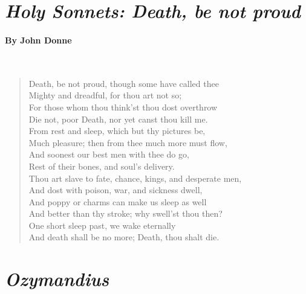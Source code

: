 \documentclass[12pt, openany, letterpaper]{memoir}
\begin{document}
\newpage
{}
\section*{\emph{Holy Sonnets: Death, be not proud}}
\paragraph{By John Donne}~
\begin{verse}
	Death, be not proud, though some have called thee\\
	Mighty and dreadful, for thou art not so;\\
	For those whom thou think'st thou dost overthrow\\
	Die not, poor Death, nor yet canst thou kill me.\\
	From rest and sleep, which but thy pictures be,\\
	Much pleasure; then from thee much more must flow,\\
	And soonest our best men with thee do go,\\
	Rest of their bones, and soul's delivery.\\
	Thou art slave to fate, chance, kings, and desperate men,\\
	And dost with poison, war, and sickness dwell,\\
	And poppy or charms can make us sleep as well\\
	And better than thy stroke; why swell'st thou then?\\
	One short sleep past, we wake eternally\\
	And death shall be no more; Death, thou shalt die.
\end{verse}

\newpage
\section*{\emph{Ozymandius}}
\end{document}
